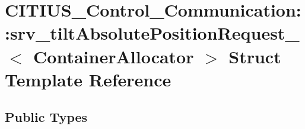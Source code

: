 \hypertarget{struct_c_i_t_i_u_s___control___communication_1_1srv__tilt_absolute_position_request__}{\section{\-C\-I\-T\-I\-U\-S\-\_\-\-Control\-\_\-\-Communication\-:\-:srv\-\_\-tilt\-Absolute\-Position\-Request\-\_\-$<$ \-Container\-Allocator $>$ \-Struct \-Template \-Reference}
\label{struct_c_i_t_i_u_s___control___communication_1_1srv__tilt_absolute_position_request__}
}
\subsection*{\-Public \-Types}
